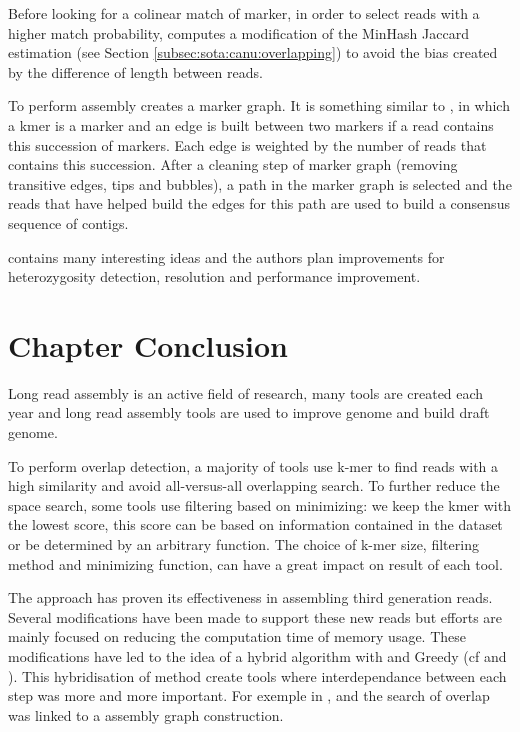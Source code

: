 \documentclass[main]{subfiles}
\begin{document}
Before looking for a colinear match of marker, in order to select reads with a higher match probability, \shasta computes a modification of the MinHash Jaccard estimation (see Section \ref{subsec:sota:canu:overlapping}) to avoid the bias created by the difference of length between reads.

To perform assembly \shasta creates a marker graph. It is something similar to \DBG, in which a kmer is a marker and an edge is built between two markers if a read contains this succession of markers. Each edge is weighted by the number of reads that contains this succession. After a cleaning step of marker graph (removing transitive edges, tips and bubbles), a path in the marker graph is selected and the reads that have helped build the edges for this path are used to build a consensus sequence of contigs.

\shasta contains many interesting ideas and the authors plan improvements for heterozygosity detection, resolution and performance improvement.

\section{Chapter Conclusion}

Long read assembly is an active field of research, many tools are created each year and long read assembly tools are used to improve genome and build draft genome.

To perform overlap detection, a majority of tools use k-mer to find reads with a high similarity and avoid all-versus-all overlapping search. To further reduce the space search, some tools use filtering based on minimizing: we keep the kmer with the lowest score, this score can be based on information contained in the dataset or be determined by an arbitrary function. The choice of k-mer size, filtering method and minimizing function, can have a great impact on result of each tool.

The \OLC approach has proven its effectiveness in assembling third generation reads. Several modifications have been made to support these new reads but efforts are mainly focused on reducing the computation time of memory usage. These modifications have led to the idea of a hybrid \OLC algorithm with \DBG and Greedy (cf \flye and \wtdbg). This hybridisation of method create tools where interdependance between each step was more and more important. For exemple in \flye, \wtdbg and \shasta the search of overlap was linked to a assembly graph construction.
\end{document}
